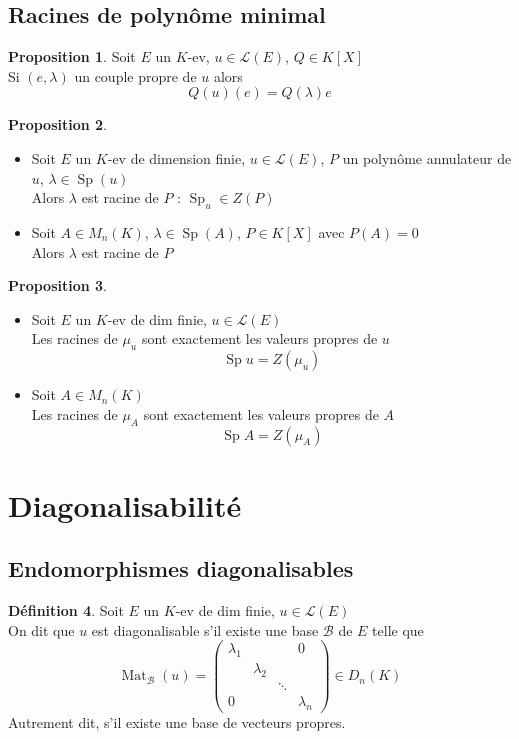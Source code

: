 \documentclass[10pt,a4paper]{article}
\theoremstyle{definition}
\newtheorem{proposition}{Proposition}[section]
\newtheorem{definition}[proposition]{Définition}
\DeclareMathOperator{\Sp}{Sp}
\DeclareMathOperator{\Mat}{Mat}
\begin{document}
\subsection{Racines de polynôme minimal}
\begin{proposition}
Soit $E$ un $K$-ev, $u \in \mathcal{L}(E)$, $Q \in K[X]$ \\
Si $(e, \lambda)$ un couple propre de $u$ alors 
\[ \boxed{Q(u)(e) = Q(\lambda)e} \]
\end{proposition}
\begin{proposition}
\hfill \begin{itemize}
\item Soit $E$ un $K$-ev de dimension finie, $u \in \mathcal{L}(E)$, $P$ un polynôme annulateur de $u$, $\lambda \in \Sp(u)$ \\
Alors $\lambda$ est racine de $P$ : $\Sp_u \in Z(P)$
\item Soit $A \in M_n(K)$, $\lambda \in \Sp(A)$, $P \in K[X]$ avec $P(A) = 0$ \\
Alors $\lambda$ est racine de $P$
\end{itemize}
\end{proposition}
\begin{proposition}
\hfill \begin{itemize}
\item Soit $E$ un $K$-ev de dim finie, $u \in \mathcal{L}(E)$ \\
Les racines de $\mu_u$ sont exactement les valeurs propres de $u$
\[ \boxed{\Sp u = Z(\mu_u)} \]
\item Soit $A \in M_n(K)$ \\
Les racines de $\mu_A$ sont exactement les valeurs propres de $A$
\[ \boxed{\Sp A = Z(\mu_A)} \]
\end{itemize}
\end{proposition}

\section{Diagonalisabilité}
\subsection{Endomorphismes diagonalisables}
\begin{definition}
Soit $E$ un $K$-ev de dim finie, $u \in \mathcal{L}(E)$ \\
On dit que $u$ est diagonalisable s'il existe une base $\mathcal{B}$ de $E$ telle que 
\[ \Mat_\mathcal{B}(u) = \begin{pmatrix}
\lambda_1 & & & 0 \\
& \lambda_2 & & \\
& & \ddots & \\
0 & & & \lambda_n
\end{pmatrix} \in D_n(K) \]
Autrement dit, s'il existe une base de vecteurs propres.
\end{definition}
\end{document}
